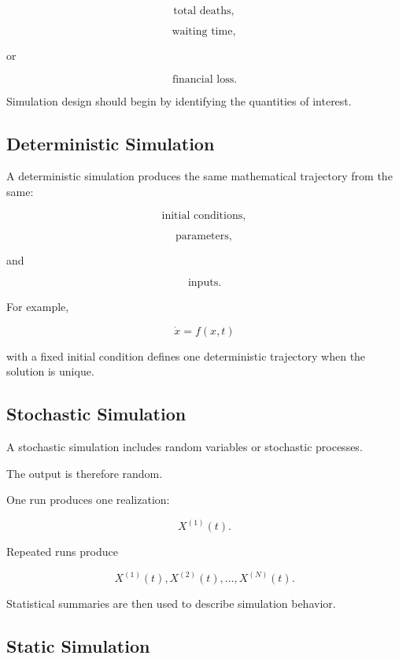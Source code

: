\[
\boxed{
\text{total deaths},
}
\]

\[
\boxed{
\text{waiting time},
}
\]

or

\[
\boxed{
\text{financial loss}.
}
\]

Simulation design should begin by identifying the quantities of interest.

\subsection{Deterministic Simulation}
\label{subsec:deterministic-simulation}

A deterministic simulation produces the same mathematical trajectory from
the same:

\[
\boxed{
\text{initial conditions},
}
\]

\[
\boxed{
\text{parameters},
}
\]

and

\[
\boxed{
\text{inputs}.
}
\]

For example,

\[
\dot{x}
=
f(x,t)
\]

with a fixed initial condition defines one deterministic trajectory when
the solution is unique.

\subsection{Stochastic Simulation}
\label{subsec:stochastic-simulation}

A stochastic simulation includes random variables or stochastic processes.

The output is therefore random.

One run produces one realization:

\[
\boxed{
X^{(1)}(t).
}
\]

Repeated runs produce

\[
\boxed{
X^{(1)}(t),
X^{(2)}(t),
\ldots,
X^{(N)}(t).
}
\]

Statistical summaries are then used to describe simulation behavior.

\subsection{Static Simulation}
\label{subsec:static-simulation}

